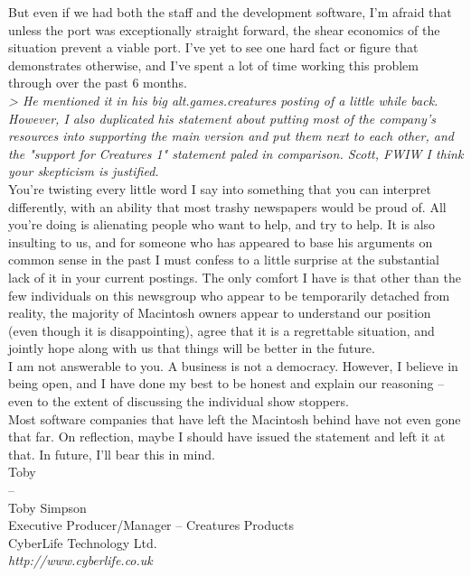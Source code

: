 \documentclass[11pt,twoside,a4paper]{article}
\begin{document}
\begin{multicols*}{2}
But even if we had both the staff and the development software, I'm afraid that unless the port was exceptionally straight forward, the shear economics of the situation prevent a viable port. I've yet to see one hard fact or figure that demonstrates otherwise, and I've spent a lot of time working this problem through over the past 6 months.~\\

\emph{> He mentioned it in his big alt.games.creatures posting of a little while back. However, I also duplicated his statement about putting most of the company's resources into supporting the main version and put them next to each other, and the "support for Creatures 1" statement paled in comparison. Scott, FWIW I think your skepticism is justified.}~\\

You're twisting every little word I say into something that you can interpret differently, with an ability that most trashy newspapers would be proud of. All you're doing is alienating people who want to help, and try to help. It is also insulting to us, and for someone who has appeared to base his arguments on common sense in the past I must confess to a little surprise at the substantial lack of it in your current postings. The only comfort I have is that other than the few individuals on this newsgroup who appear to be temporarily detached from reality, the majority of Macintosh owners appear to understand our position (even though it is disappointing), agree that it is a regrettable situation, and jointly hope along with us that things will be better in the future.~\\

I am not answerable to you. A business is not a democracy. However, I believe in being open, and I have done my best to be honest and explain our reasoning -- even to the extent of discussing the individual show stoppers.~\\
Most software companies that have left the Macintosh behind have not even gone that far. On reflection, maybe I should have issued the statement and left it at that. In future, I'll bear this in mind.~\\

Toby~\\
-- ~\\
Toby Simpson~\\
Executive Producer/Manager -- Creatures Products~\\
CyberLife Technology Ltd.~\\
\emph{http://www.cyberlife.co.uk}~\\


\end{multicols*}
\end{document}
